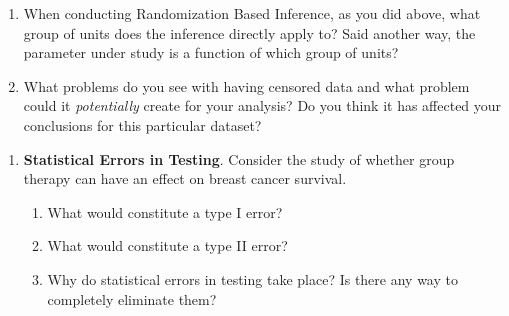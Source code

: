 \documentclass[
  letterpaper,
  DIV=11,
  numbers=noendperiod]{scrartcl}
\providecommand{\tightlist}{%
  \setlength{\itemsep}{0pt}\setlength{\parskip}{0pt}}
\begin{document}
\begin{enumerate}
\begin{enumerate}
    \begin{enumerate}
    \def\labelenumiii{\roman{enumiii}.}
    \tightlist
    \item
      Answer this using randomization inference and two different test
      statistics: the difference in means and the difference in
      medians\footnote{You can augment the \texttt{rand\_stats()}
        function to take
        \texttt{stat\ =\ c("diff\ in\ mean",\ "diff\ in\ medians")} as
        an argumnent and then copy and modify the \texttt{if} block to
        calculate the appropriate statistic when
        \texttt{stat\ ==\ "diff\ in\ medians"}.}.
    \item
      Answer this using model-based inference using a two-sample t-test
      using the pooled estimate of the standard deviation\footnote{This
        should be a review from your course in Statistical Inference. If
        you need a brush up, see
        \url{https://www.itl.nist.gov/div898/handbook/eda/section3/eda353.htm}
        and \texttt{?t.test} in R.}.
    \item
      Compare the methods by first describing the different ways they
      conceive of randomness and then comparing the results and what
      they say about the research question.
    \end{enumerate}
  \item
    When conducting Randomization Based Inference, as you did above,
    what group of units does the inference directly apply to? Said
    another way, the parameter under study is a function of which group
    of units?
  \item
    What problems do you see with having censored data and what problem
    could it \emph{potentially} create for your analysis? Do you think
    it has affected your conclusions for this particular dataset?
  \end{enumerate}
\end{enumerate}

\newpage{}

\begin{enumerate}
\def\labelenumi{\arabic{enumi}.}
\setcounter{enumi}{1}
\item
  \textbf{Statistical Errors in Testing}. Consider the study of whether
  group therapy can have an effect on breast cancer survival.

  \begin{enumerate}
  \def\labelenumii{\alph{enumii}.}
  \tightlist
  \item
    What would constitute a type I error?
  \item
    What would constitute a type II error?
  \item
    Why do statistical errors in testing take place? Is there any way to
    completely eliminate them?
  \end{enumerate}
\end{enumerate}
\end{document}
